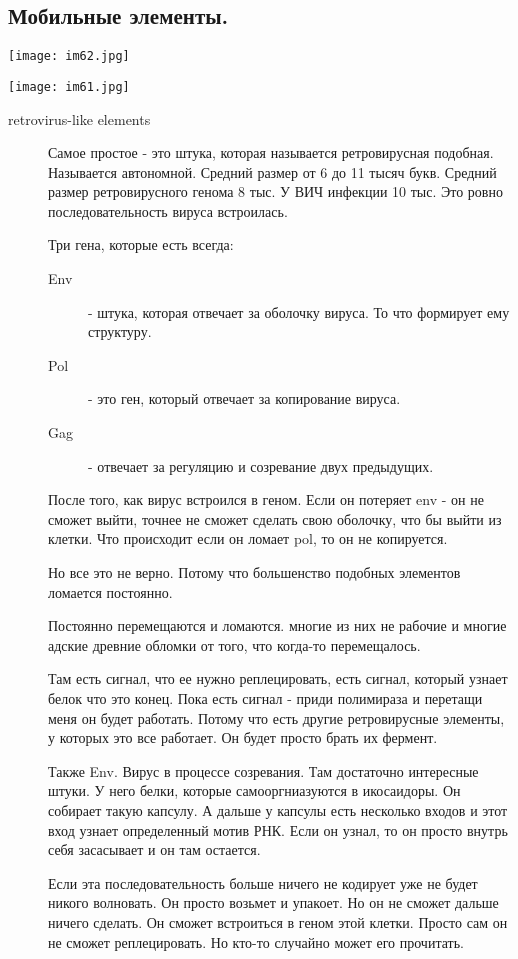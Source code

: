 \subsection{Мобильные элементы.} 
\texttt{[image: im62.jpg]}

\texttt{[image: im61.jpg]}

\begin{description}
\item[retrovirus-like elements]
Самое простое - это штука, которая называется 
ретровирусная подобная. Называется автономной. 
Средний размер от 6 до 11 тысяч букв. Средний 
размер ретровирусного генома 8 тыс. У ВИЧ 
инфекции 10 тыс. Это ровно последовательность 
вируса встроилась. 

Три гена, которые есть всегда: 
\begin{description}
\item[Env] - штука, 
которая отвечает за оболочку вируса. То что формирует ему структуру. 
\item[Pol] - это ген, который отвечает за копирование вируса. 
\item[Gag] - отвечает за регуляцию и созревание двух предыдущих. 
\end{description}

После того, как вирус встроился в геном. Если он потеряет env - он не 
сможет выйти, точнее не сможет сделать свою 
оболочку, что бы выйти из клетки. Что происходит если он 
ломает pol, то он не копируется. 

Но все это не верно. 
Потому что большенство подобных элементов ломается постоянно. 

Постоянно перемещаются и ломаются. многие из них не рабочие и 
многие адские древние обломки от того, что когда-то перемещалось. 

Там есть сигнал, что ее нужно реплецировать, есть 
сигнал, который узнает белок что это конец. Пока есть 
сигнал - приди полимираза и перетащи меня он будет 
работать. Потому что есть другие ретровирусные элементы, 
у которых это все работает. Он будет просто брать их фермент. 

Также Env. Вирус в процессе созревания. Там достаточно интересные штуки. 
У него белки, которые самооргниазуются в икосаидоры. Он собирает 
такую капсулу. А дальше у капсулы есть несколько входов и 
этот вход узнает определенный мотив РНК. Если он узнал, то 
он просто внутрь себя засасывает и он там остается. 

Если эта последовательность больше ничего не кодирует уже не будет никого волновать. 
Он просто возьмет и упакоет. 
Но он не сможет дальше ничего сделать. Он сможет встроиться в геном этой 
клетки. Просто сам он не сможет реплецировать. Но кто-то случайно может его прочитать. 


\end{description}
